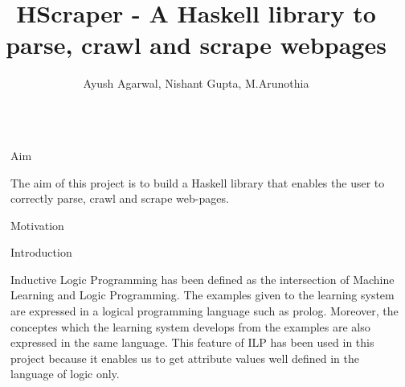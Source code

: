 \documentclass[final,hyperref={pdfpagelabels=false}]{beamer}
\title{\huge HScraper - A Haskell library to parse, crawl and scrape webpages} %
\author{Ayush Agarwal, Nishant Gupta, M.Arunothia} %
\institute{Indian Institute of Technology Kanpur} %
\begin{document}

\begin{frame}[t] %

\begin{columns}[t] %

\begin{column}{.02\textwidth}\end{column} %

\begin{column}{.465\textwidth} %


\begin{block}{Aim}

 The aim of this project is to build a Haskell library that enables the user to correctly parse, crawl and scrape web-pages. 
\end{block}

\begin{block}{Motivation}
 

\end{block}


            
\begin{block}{Introduction}

Inductive Logic Programming has been defined as the intersection of Machine Learning and Logic Programming. The examples given to the learning system are expressed in a logical programming language such as prolog. Moreover, the conceptes which the learning system develops from the examples are also expressed in the same language. This feature of ILP has been used in this project because it enables us to get attribute values well defined in the language of logic only. ~\cite{progol_manual}  

\end{block}


\end{column}
\end{columns}
\end{frame}
\end{document}
